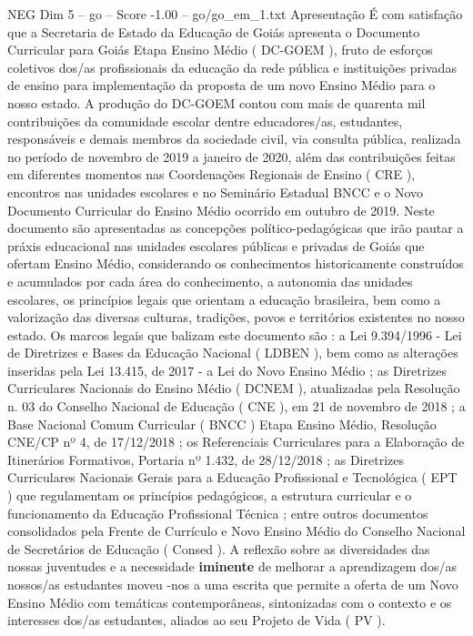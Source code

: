 \begin{textsample}{NEG Dim 5 – go – Score -1.00 – go/go\_em\_1.txt}  \label{ex:f5_neg_272}
Apresentação É com satisfação que a Secretaria de Estado da Educação de Goiás apresenta o Documento Curricular para Goiás Etapa Ensino Médio ( DC-GOEM ), fruto de esforços coletivos dos/as profissionais da educação da rede pública e instituições privadas de ensino para implementação da proposta de um novo Ensino Médio para o nosso estado.
A produção do DC-GOEM contou com mais de quarenta mil contribuições da comunidade escolar dentre educadores/as, estudantes, responsáveis e demais membros da sociedade civil, via consulta pública, realizada no período de novembro de 2019 a janeiro de 2020, além das contribuições feitas em diferentes momentos nas Coordenações Regionais de Ensino ( CRE ), encontros nas unidades escolares e no Seminário Estadual BNCC e o Novo Documento Curricular do Ensino Médio ocorrido em outubro de 2019.
Neste documento são apresentadas as concepções político-pedagógicas que irão pautar a práxis educacional nas unidades escolares públicas e privadas de Goiás que ofertam Ensino Médio, considerando os conhecimentos historicamente construídos e acumulados por cada área do conhecimento, a autonomia das unidades escolares, os princípios legais que orientam a educação brasileira, bem como a valorização das diversas culturas, tradições, povos e territórios existentes no nosso estado.
Os marcos legais que balizam este documento são : a Lei 9.394/1996 - Lei de Diretrizes e Bases da Educação Nacional ( LDBEN ), bem como as alterações inseridas pela Lei 13.415, de 2017 - a Lei do Novo Ensino Médio ; as Diretrizes Curriculares Nacionais do Ensino Médio ( DCNEM ), atualizadas pela Resolução n. 03 do Conselho Nacional de Educação ( CNE ), em 21 de novembro de 2018 ; a Base Nacional Comum Curricular ( BNCC ) Etapa Ensino Médio, Resolução CNE/CP nº 4, de 17/12/2018 ; os Referenciais Curriculares para a Elaboração de Itinerários Formativos, Portaria nº 1.432, de 28/12/2018 ; as Diretrizes Curriculares Nacionais Gerais para a Educação Profissional e Tecnológica ( EPT ) que regulamentam os princípios pedagógicos, a estrutura curricular e o funcionamento da Educação Profissional Técnica ; entre outros documentos consolidados pela Frente de Currículo e Novo Ensino Médio do Conselho Nacional de Secretários de Educação ( Consed ).
A reflexão sobre as diversidades das nossas juventudes e a necessidade \textbf{iminente} de melhorar a aprendizagem dos/as nossos/as estudantes moveu -nos a uma escrita que permite a oferta de um Novo Ensino Médio com temáticas contemporâneas, sintonizadas com o contexto e os interesses dos/as estudantes, aliados ao seu Projeto de Vida ( PV ).

\end{textsample}
